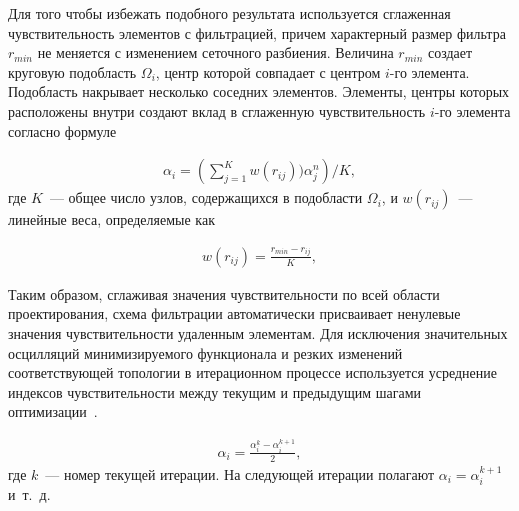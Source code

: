 Для того чтобы избежать подобного результата используется сглаженная чувствительность элементов с фильтрацией, причем характерный размер фильтра $r_{min}$ не меняется с изменением сеточного разбиения. Величина $r_{min}$ создает круговую подобласть $\Omega_i$, центр которой совпадает с центром $i$-го элемента. Подобласть   накрывает несколько соседних элементов. Элементы, центры которых расположены внутри   создают вклад в сглаженную чувствительность $i$-го элемента согласно формуле

\begin{equation}\label{eq:alpha}
	\begin{aligned}
		\alpha_i = \left(\sum_{j=1}^K w(r_{ij})) \alpha_j^n \right)/K,
	\end{aligned}
\end{equation}
где $K$~--- общее число узлов, содержащихся в подобласти $\Omega_i$, и $w(r_{ij})$~--- линейные веса, определяемые как

\begin{equation}\label{eq:w}
	\begin{aligned}
		w(r_{ij}) = \frac{r_{min}-r_{ij}}{K},
	\end{aligned}
\end{equation}

Таким образом, сглаживая значения чувствительности по всей области проектирования, схема фильтрации автоматически присваивает ненулевые значения чувствительности удаленным элементам. Для исключения значительных осцилляций минимизируемого функционала и резких изменений соответствующей топологии в итерационном процессе используется усреднение индексов чувствительности между текущим и предыдущим шагами оптимизации~\cite{Shevtsov2014}.

\begin{equation}\label{eq:w}
	\begin{aligned}
\alpha_i = \frac{\alpha_i^k - \alpha_i^{k+1}}{2},
	\end{aligned}
\end{equation}
где $k$~--- номер текущей итерации. На следующей итерации полагают $\alpha_i=\alpha_i^{k+1}$ и~т.~д. 


